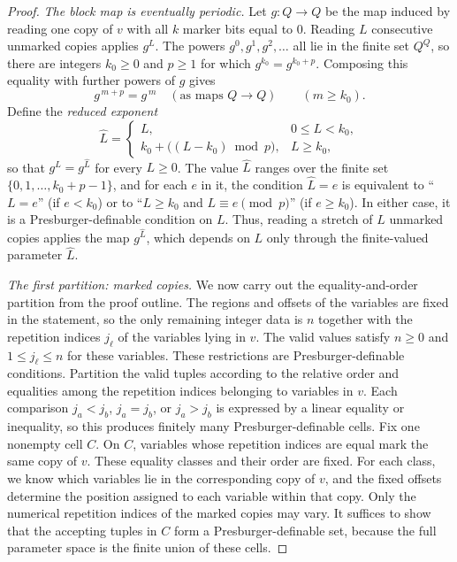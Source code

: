 \documentclass[11pt]{article}
\theoremstyle{definition}
\begin{document}
\begin{proof}
\vspace{0.5em}
\noindent\emph{The block map is eventually periodic.}
Let $g\colon Q\to Q$ be the map induced by reading one copy of $v$ with all $k$
marker bits equal to $0$.  Reading $L$ consecutive unmarked copies applies
$g^{L}$.  The powers $g^0,g^1,g^2,\ldots$ all lie in the finite set $Q^Q$, so
there are integers $k_0\ge0$ and $p\ge1$ for which
$g^{k_0}=g^{k_0+p}$.  Composing this equality with further powers of $g$ gives
\[
   g^{\,m+p}=g^{\,m}\quad(\text{as maps }Q\to Q)\qquad(m\ge k_0).
\]
Define the \emph{reduced exponent}
\[
   \widehat L=
   \begin{cases}
     L, & 0\le L<k_0,\\
     k_0+\bigl((L-k_0)\bmod p\bigr), & L\ge k_0,
   \end{cases}
\]
so that $g^{L}=g^{\widehat L}$ for every $L\ge 0$.  The value $\widehat L$
ranges over the finite set $\{0,1,\ldots,k_0+p-1\}$, and for each $e$ in it,
the condition $\widehat L=e$ is equivalent to ``$L=e$'' (if $e<k_0$) or to
``$L\ge k_0$ and $L\equiv e\pmod p$'' (if $e\ge k_0$).  In either case, it is
a Presburger-definable condition on $L$.  Thus, reading a stretch of $L$
unmarked copies applies the map $g^{\widehat L}$, which depends on $L$ only
through the finite-valued parameter $\widehat L$.

\vspace{0.5em}
\noindent\emph{The first partition: marked copies.}
We now carry out the equality-and-order partition from the proof outline.  The
regions and offsets of the variables are fixed in the statement, so the only
remaining integer data is $n$ together with the repetition indices $j_\ell$ of
the variables lying in $v$.  The valid values satisfy $n\ge0$ and
$1\le j_\ell\le n$ for these variables.  These restrictions are
Presburger-definable conditions.  Partition the valid tuples according to
the relative order and equalities among the repetition indices belonging to
variables in $v$.  Each comparison $j_a<j_b$, $j_a=j_b$, or $j_a>j_b$ is
expressed by a linear equality or inequality, so this produces finitely many
Presburger-definable cells.  Fix one nonempty cell
$C$.  On $C$, variables whose repetition indices are equal mark the same copy
of $v$.  These equality classes and their order are fixed.  For each class, we
know which variables lie in the corresponding copy of $v$, and the fixed
offsets determine the position assigned to each variable within that copy.
Only the numerical repetition indices of the marked copies may vary.  It
suffices to show that the accepting tuples in $C$ form a Presburger-definable
set, because the full parameter space is the finite union of these cells.


\end{proof}
\end{document}
